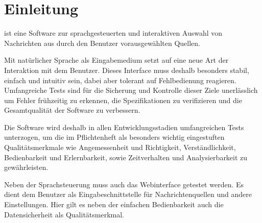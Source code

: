 
\chapter{Einleitung}

\NewsGenie ist eine Software zur sprachgesteuerten und interaktiven Auswahl von
Nachrichten aus durch den Benutzer vorausgewählten Quellen.

Mit natürlicher Sprache als Eingabemedium setzt \NewsGenie auf eine neue Art der
Interaktion mit dem Benutzer. Dieses Interface muss deshalb besonders stabil,
einfach und intuitiv sein, dabei aber tolerant auf Fehlbedienung reagieren.
Umfangreiche Tests sind für die Sicherung und Kontrolle dieser Ziele
unerlässlich um Fehler frühzeitig zu erkennen, die Spezifikationen zu
verifizieren und die Gesamtqualität der Software zu verbessern.

Die Software wird deshalb in allen Entwicklungsstadien umfangreichen Tests
unterzogen, um die im Pflichtenheft als besonders wichtig eingestuften
Qualitätsmerkmale wie Angemessenheit und Richtigkeit, Verständlichkeit,
Bedienbarkeit und Erlernbarkeit, sowie Zeitverhalten und Analysierbarkeit zu
gewährleisten.

Neben der Sprachsteuerung muss auch das Webinterface getestet werden. Es dient
dem Benutzer als Eingabeschnittstelle für Nachrichtenquellen und andere
Einstellungen. Hier gilt es neben der einfachen Bedienbarkeit auch die
Datensicherheit als Qualitätsmerkmal.


